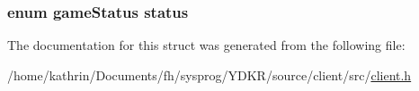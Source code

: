 \label{structglobal__client__info_a5903d0b282fc5eae503de618f896b5e1}
\hypertarget{structglobal__client__info_a364d090f640056ac79ce3ca1416407ef}{
\subsubsection[{status}]{\setlength{\rightskip}{0pt plus 5cm}enum {\bf gameStatus} {\bf status}}}
\label{structglobal__client__info_a364d090f640056ac79ce3ca1416407ef}


The documentation for this struct was generated from the following file:\begin{DoxyCompactItemize}
\item 
/home/kathrin/Documents/fh/sysprog/YDKR/source/client/src/\hyperlink{client_2src_2client_8h}{client.h}\end{DoxyCompactItemize}
